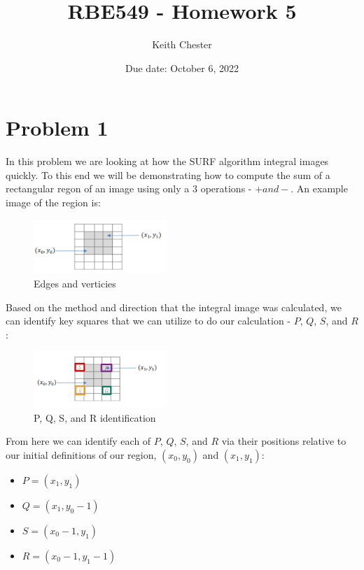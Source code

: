 \documentclass{article}
\title{RBE549 - Homework 5}
\author{Keith Chester}
\date{Due date: October 6, 2022}
\begin{document}
\maketitle

\section*{Problem 1}

In this problem we are looking at how the SURF algorithm integral images quickly. To this end we will be demonstrating how to compute the sum of a rectangular regon of an image using only a $3$ operations - $+ and -$. An example image of the region is:

\begin{figure}[H]
    \centering
    \includegraphics[width = 0.45\textwidth]{imgs/prob1.png}
    \caption{Edges and verticies}
    \label{fig:prob1-1}
\end{figure}

Based on the method and direction that the integral image was calculated, we can identify key squares that we can utilize to do our calculation - $P$, $Q$, $S$, and $R$:

\begin{figure}[H]
    \centering
    \includegraphics[width = 0.45\textwidth]{imgs/psqr.png}
    \caption{P, Q, S, and R identification}
    \label{fig:prob1-2}
\end{figure}

From here we can identify each of $P$, $Q$, $S$, and $R$ via their positions relative to our initial definitions of our region, $(x_0, y_0)$ and $(x_1, y_1)$:

\begin{itemize}
    \item $P=(x_1, y_1)$
    \item $Q=(x_1, y_0 - 1)$
    \item $S=(x_0-1, y_1)$
    \item $R=(x_0-1, y_1-1)$
\end{itemize}
\end{document}
